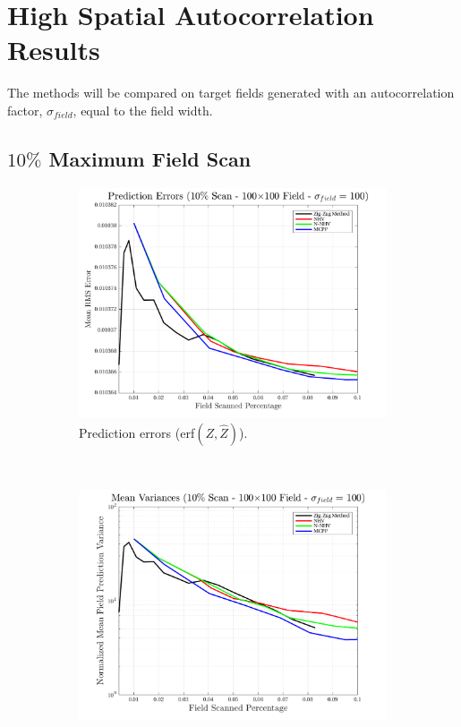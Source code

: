 \section{High Spatial Autocorrelation Results}
The methods will be compared on target fields generated with an autocorrelation factor, $\sigma_{field}$, equal to the field width.

\clearpage
\subsection{$10\%$ Maximum Field Scan}
\begin{figure}[htb!]
    \centering
    \begin{subfigure}[t]{0.65\textwidth}
        \centering
        \includegraphics[width=\linewidth]{figures/hbresults/pred_errs_10p_100x100_sf_100_seed_2.png}
        \captionsetup{skip=0.20\baselineskip,size=footnotesize}
        \caption{Prediction errors (erf$(Z,\hat{Z})$).}
        \label{fig:prederrs_sigma100_p10_s2}
    \end{subfigure}%
    \\
    \begin{subfigure}[t]{0.65\textwidth}
        \centering
        \includegraphics[width=\linewidth]{figures/hbresults/vars_10p_100x100_sf_100_seed_2.png}

\end{subfigure}
\end{figure}
